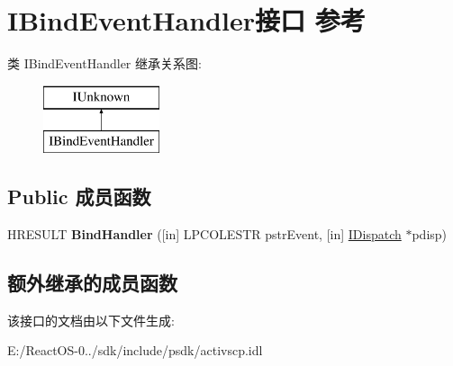 \hypertarget{interface_i_bind_event_handler}{}\section{I\+Bind\+Event\+Handler接口 参考}
\label{interface_i_bind_event_handler}
类 I\+Bind\+Event\+Handler 继承关系图\+:\begin{figure}[H]
\begin{center}
\leavevmode
\includegraphics[height=2.000000cm]{interface_i_bind_event_handler}
\end{center}
\end{figure}
\subsection*{Public 成员函数}
\begin{DoxyCompactItemize}
\item 
\mbox{\label{interface_i_bind_event_handler_a55690491a0ba31071af8891b9a234dcb}} 
H\+R\+E\+S\+U\+LT {\bfseries Bind\+Handler} (\mbox{[}in\mbox{]} L\+P\+C\+O\+L\+E\+S\+TR pstr\+Event, \mbox{[}in\mbox{]} \hyperlink{interface_i_dispatch}{I\+Dispatch} $\ast$pdisp)
\end{DoxyCompactItemize}
\subsection*{额外继承的成员函数}


该接口的文档由以下文件生成\+:\begin{DoxyCompactItemize}
\item 
E\+:/\+React\+O\+S-\/0../sdk/include/psdk/activscp.\+idl\end{DoxyCompactItemize}
